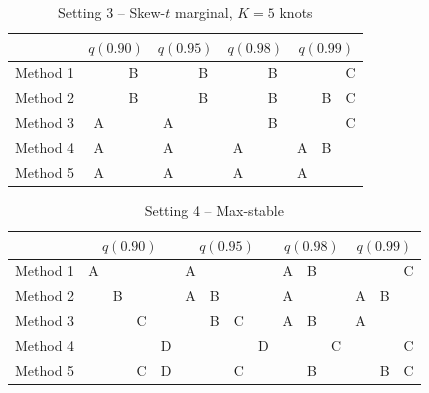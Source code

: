 \documentclass[11pt]{article}
\begin{document}
\begin{table}[htbp]
  \centering
  \caption{Setting 3 -- Skew-$t$ marginal, $K = 5$ knots}
  \label{tbl:st5sim}
  \begin{tabular}{|l|cc|cc|cc|ccc|}
    \cline{2-10}
    \multicolumn{1}{c}{} & \multicolumn{2}{|c}{$q(0.90)$} & \multicolumn{2}{|c}{$q(0.95)$} & \multicolumn{2}{|c}{$q(0.98)$} & \multicolumn{3}{|c|}{$q(0.99)$} \\
    \hline
    Method 1 &   & B &   & B &   & B &   &   & C \\
    \hline
    Method 2 &   & B &   & B &   & B &   & B & C \\
    \hline
    Method 3 & A &   & A &   &   & B &   &   & C \\
    \hline
    Method 4 & A &   & A &   & A &   & A & B &   \\
    \hline
    Method 5 & A &   & A &   & A &   & A &   &   \\
    \hline
  \end{tabular}
\end{table}

\begin{table}[htbp]
  \centering
  \caption{Setting 4 -- Max-stable}
  \label{tbl:mssim}
  \begin{tabular}{|l|cccc|cccc|ccc|ccc|}
    \cline{2-15}
    \multicolumn{1}{c}{} & \multicolumn{4}{|c}{$q(0.90)$} & \multicolumn{4}{|c}{$q(0.95)$} & \multicolumn{3}{|c}{$q(0.98)$} & \multicolumn{3}{|c|}{$q(0.99)$} \\
    \hline
    Method 1 & A &   &   &   & A &   &   &   & A & B &   &   &   & C \\
    \hline
    Method 2 &   & B &   &   & A & B &   &   & A &   &   & A & B &   \\
    \hline
    Method 3 &   &   & C &   &   & B & C &   & A & B &   & A &   &   \\
    \hline
    Method 4 &   &   &   & D &   &   &   & D &   &   & C &   &   & C \\
    \hline
    Method 5 &   &   & C & D &   &   & C &   &   & B &   &   & B & C \\
    \hline
  \end{tabular}
\end{table}
\end{document}
